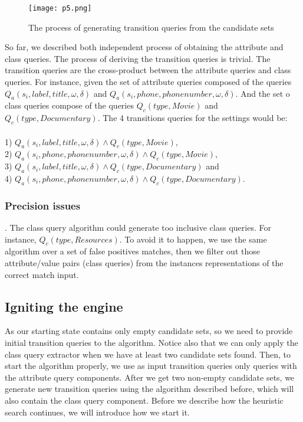 \begin{figure} 
\centering
\texttt{[image: p5.png]}
\caption{The process of generating transition queries from the candidate sets} 
\end{figure} 

So far, we described both independent process of obtaining the attribute and class queries. The process of deriving the transition queries is  trivial. The transition queries are the cross-product between the attribute queries and class queries. For instance, given the set of attribute queries composed of the queries $Q_a(s_i,label,title, \omega, \delta)$ and $Q_a( s_i, phone, phonenumber,  \omega, \delta)$. And the set o class queries compose of the queries $Q_c(type, Movie)$ and $Q_c(type, Documentary)$. The 4 transitions queries for the settings would be: 
\\
\\
1) $Q_a(s_i,label,title, \omega, \delta) \wedge Q_c(type, Movie)$, \\
2) $Q_a( s_i, phone, phonenumber,  \omega, \delta) \wedge Q_c(type, Movie)$,  \\
3) $Q_a(s_i,label,title, \omega, \delta) \wedge Q_c(type, Documentary)$ and \\
4) $Q_a( s_i, phone, phonenumber,  \omega, \delta) \wedge Q_c(type, Documentary)$. 
 
\subsubsection{Precision issues}. The class query algorithm could generate too inclusive class queries. For instance, $Q_c(type, Resources)$. To avoid it to happen, we use the same algorithm over a set of false positives matches, then we filter out those attribute/value pairs (class queries) from the instances representations of the correct match input.
 
\subsection{Igniting the engine} 

As our starting state contains only empty candidate sets, so we need to provide initial transition queries to the algorithm.
Notice also that we can only apply the class query extractor when we have at least two candidate sets found. Then, to start the algorithm properly, we use as input transition queries only queries with the attribute query components. After we get two non-empty candidate sets, we generate new transition queries using the algorithm described before, which will also contain the class query component.  Before we describe how the heuristic search continues, we will introduce how we start it.

